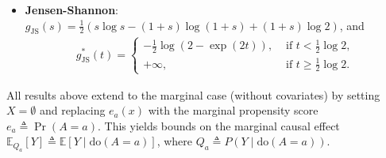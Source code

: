 {\begin{corollary}
\begin{itemize}[leftmargin=*]
\begin{align}
            g^{\ast}_{\mathrm{TV}}(t)  = 
            \begin{cases}
                 -\frac{1}{2}, & \text{ if } t \leq -\frac{1}{2}, \\
                 t, & \text{ if } -\frac{1}{2} < t \leq \frac{1}{2}, \\
                 +\infty, &\text{ if } t > \frac{1}{2}. 
            \end{cases}
        \end{align}
        \item \textbf{Jensen-Shannon}: $g_{\mathrm{JS}}(s) = \frac{1}{2}\left(s\log s - (1+s) \log(1+s) + (1+s)\log 2\right)$, and 
        \begin{align}
            g^{\ast}_{\mathrm{JS}}(t)  = 
            \begin{cases}
                 -\frac{1}{2}\log \left( 2 - \exp(2t) \right), & \text{ if } t < \frac{1}{2}\log 2, \\
                 +\infty, &\text{ if } t \geq \frac{1}{2}\log 2. 
            \end{cases}
        \end{align}
    \end{itemize}
\end{corollary}
}

All results above extend to the marginal case (without covariates) by setting $X=\emptyset$ and replacing $e_a(x)$ with the marginal propensity score $e_a \triangleq \Pr(A=a)$. This yields bounds on the marginal causal effect $\mathbb{E}_{Q_a}[Y] \triangleq \mathbb{E}[Y \mid \mathrm{do}(A=a)]$, where $Q_a \triangleq P(Y \mid \mathrm{do}(A=a))$. 
